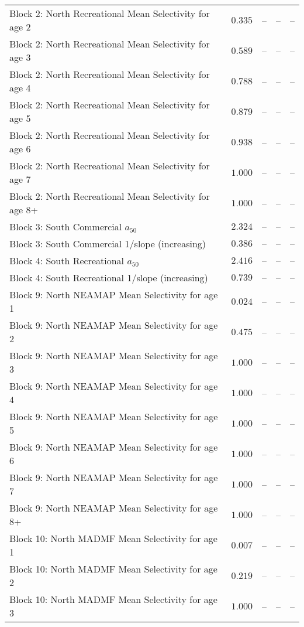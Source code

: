 \documentclass[
]{article}
\begin{document}
\begin{landscape}
\begin{longtable}[t]{lrrrr}
\addlinespace
Block 2: North Recreational Mean Selectivity for age 2 & $0.335$ & -- & -- & --\\
Block 2: North Recreational Mean Selectivity for age 3 & $0.589$ & -- & -- & --\\
Block 2: North Recreational Mean Selectivity for age 4 & $0.788$ & -- & -- & --\\
Block 2: North Recreational Mean Selectivity for age 5 & $0.879$ & -- & -- & --\\
Block 2: North Recreational Mean Selectivity for age 6 & $0.938$ & -- & -- & --\\
\addlinespace
Block 2: North Recreational Mean Selectivity for age 7 & $1.000$ & -- & -- & --\\
Block 2: North Recreational Mean Selectivity for age 8+ & $1.000$ & -- & -- & --\\
Block 3: South Commercial $a_{50}$ & $2.324$ & -- & -- & --\\
Block 3: South Commercial 1/slope (increasing) & $0.386$ & -- & -- & --\\
Block 4: South Recreational $a_{50}$ & $2.416$ & -- & -- & --\\
\addlinespace
Block 4: South Recreational 1/slope (increasing) & $0.739$ & -- & -- & --\\
Block 9: North NEAMAP Mean Selectivity for age 1 & $0.024$ & -- & -- & --\\
Block 9: North NEAMAP Mean Selectivity for age 2 & $0.475$ & -- & -- & --\\
Block 9: North NEAMAP Mean Selectivity for age 3 & $1.000$ & -- & -- & --\\
Block 9: North NEAMAP Mean Selectivity for age 4 & $1.000$ & -- & -- & --\\
\addlinespace
Block 9: North NEAMAP Mean Selectivity for age 5 & $1.000$ & -- & -- & --\\
Block 9: North NEAMAP Mean Selectivity for age 6 & $1.000$ & -- & -- & --\\
Block 9: North NEAMAP Mean Selectivity for age 7 & $1.000$ & -- & -- & --\\
Block 9: North NEAMAP Mean Selectivity for age 8+ & $1.000$ & -- & -- & --\\
Block 10: North MADMF Mean Selectivity for age 1 & $0.007$ & -- & -- & --\\
\addlinespace
Block 10: North MADMF Mean Selectivity for age 2 & $0.219$ & -- & -- & --\\
Block 10: North MADMF Mean Selectivity for age 3 & $1.000$ & -- & -- & --\\

\end{longtable}
\end{landscape}
\end{document}
